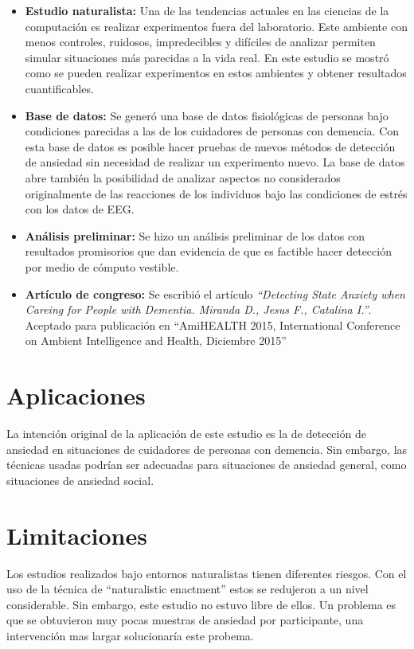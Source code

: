 	\begin{itemize}
		\item \textbf{Estudio naturalista:} Una de las tendencias actuales en las ciencias de la computaci\'on es realizar experimentos fuera del laboratorio. Este ambiente con menos controles, ruidosos, impredecibles y dif\'iciles de analizar permiten simular situaciones m\'as parecidas a la vida real. En este estudio se mostr\'o como se pueden realizar experimentos en estos ambientes y obtener resultados cuantificables.

	\item \textbf{Base de datos:} Se gener\'o una base de datos fisiol\'ogicas de personas bajo condiciones parecidas a las de los cuidadores de personas con demencia. Con esta base de datos es posible hacer pruebas de nuevos m\'etodos de detecci\'on de ansiedad sin necesidad de realizar un experimento nuevo. La base de datos abre tambi\'en la posibilidad de analizar aspectos no considerados originalmente de las reacciones de los individuos bajo las condiciones de estr\'es con los datos de EEG.

	\item \textbf{An\'alisis preliminar:} Se hizo un an\'alisis preliminar de los datos con resultados promisorios que dan evidencia de que es factible hacer detecci\'on por medio de c\'omputo vestible.
	\item \textbf{Art\'iculo de congreso:} Se escribi\'o el art\'iculo \textit{``Detecting State Anxiety when Careing for People with Dementia. Miranda D., Jesus F., Catalina I.''}. Aceptado para publicaci\'on en ``AmiHEALTH 2015, International Conference on Ambient Intelligence and Health, Diciembre 2015''
	\end{itemize}
\section{Aplicaciones}
	La intenci\'on original de la aplicaci\'on de este estudio es la de detecci\'on de ansiedad en situaciones de cuidadores de personas con demencia. Sin embargo, las t\'ecnicas usadas podr\'ian ser adecuadas para situaciones de ansiedad general, como situaciones de ansiedad social.
\section{Limitaciones}
        Los estudios realizados bajo entornos naturalistas tienen diferentes riesgos. Con el uso de la t\'ecnica de ``naturalistic enactment'' estos se redujeron a un nivel considerable. Sin embargo, este estudio no estuvo libre de ellos. Un problema es que se obtuvieron muy pocas muestras de ansiedad por participante, una intervenci\'on mas largar solucionar\'ia este probema.

